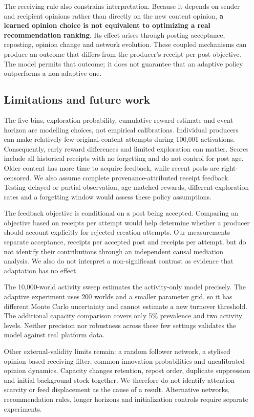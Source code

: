 \documentclass[runningheads]{llncs}
\begin{document}
The receiving rule also constrains interpretation. Because it depends on sender and recipient opinions rather than directly on the new content opinion, \textbf{a learned opinion choice is not equivalent to optimizing a real recommendation ranking}. Its effect arises through posting acceptance, reposting, opinion change and network evolution. These coupled mechanisms can produce an outcome that differs from the producer's receipt-per-post objective. The model permits that outcome; it does not guarantee that an adaptive policy outperforms a non-adaptive one.

\subsection{Limitations and future work}

The five bins, exploration probability, cumulative reward estimate and event horizon are modelling choices, not empirical calibrations. Individual producers can make relatively few original-content attempts during 100,001 activations. Consequently, early reward differences and limited exploration can matter. Scores include all historical receipts with no forgetting and do not control for post age. Older content has more time to acquire feedback, while recent posts are right-censored. We also assume complete provenance-attributed receipt feedback. Testing delayed or partial observation, age-matched rewards, different exploration rates and a forgetting window would assess these policy assumptions.

The feedback objective is conditional on a post being accepted. Comparing an objective based on receipts per attempt would help determine whether a producer should account explicitly for rejected creation attempts. Our measurements separate acceptance, receipts per accepted post and receipts per attempt, but do not identify their contributions through an independent causal mediation analysis. We also do not interpret a non-significant contrast as evidence that adaptation has no effect.

The 10,000-world activity sweep estimates the activity-only model precisely. The adaptive experiment uses 200 worlds and a smaller parameter grid, so it has different Monte Carlo uncertainty and cannot estimate a new turnover threshold. The additional capacity comparison covers only 5\% prevalence and two activity levels. Neither precision nor robustness across these few settings validates the model against real platform data.

Other external-validity limits remain: a random follower network, a stylised opinion-based receiving filter, common innovation probabilities and uncalibrated opinion dynamics. Capacity changes retention, repost order, duplicate suppression and initial background stock together. We therefore do not identify attention scarcity or feed displacement as the cause of a result. Alternative networks, recommendation rules, longer horizons and initialization controls require separate experiments.
\end{document}
